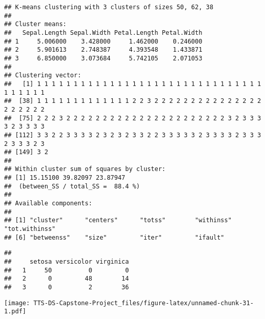 \documentclass[
]{article}
\newenvironment{Shaded}{\begin{snugshade}}{\end{snugshade}}
\newcommand{\AttributeTok}[1]{\textcolor[rgb]{0.77,0.63,0.00}{#1}}
\newcommand{\CommentTok}[1]{\textcolor[rgb]{0.56,0.35,0.01}{\textit{#1}}}
\newcommand{\DecValTok}[1]{\textcolor[rgb]{0.00,0.00,0.81}{#1}}
\newcommand{\FunctionTok}[1]{\textcolor[rgb]{0.00,0.00,0.00}{#1}}
\newcommand{\NormalTok}[1]{#1}
\newcommand{\SpecialCharTok}[1]{\textcolor[rgb]{0.00,0.00,0.00}{#1}}
\newcommand{\StringTok}[1]{\textcolor[rgb]{0.31,0.60,0.02}{#1}}
\begin{document}
\begin{verbatim}
## K-means clustering with 3 clusters of sizes 50, 62, 38
## 
## Cluster means:
##   Sepal.Length Sepal.Width Petal.Length Petal.Width
## 1     5.006000    3.428000     1.462000    0.246000
## 2     5.901613    2.748387     4.393548    1.433871
## 3     6.850000    3.073684     5.742105    2.071053
## 
## Clustering vector:
##   [1] 1 1 1 1 1 1 1 1 1 1 1 1 1 1 1 1 1 1 1 1 1 1 1 1 1 1 1 1 1 1 1 1 1 1 1 1 1
##  [38] 1 1 1 1 1 1 1 1 1 1 1 1 1 2 2 3 2 2 2 2 2 2 2 2 2 2 2 2 2 2 2 2 2 2 2 2 2
##  [75] 2 2 2 3 2 2 2 2 2 2 2 2 2 2 2 2 2 2 2 2 2 2 2 2 2 2 3 2 3 3 3 3 2 3 3 3 3
## [112] 3 3 2 2 3 3 3 3 2 3 2 3 2 3 3 2 2 3 3 3 3 3 2 3 3 3 3 2 3 3 3 2 3 3 3 2 3
## [149] 3 2
## 
## Within cluster sum of squares by cluster:
## [1] 15.15100 39.82097 23.87947
##  (between_SS / total_SS =  88.4 %)
## 
## Available components:
## 
## [1] "cluster"      "centers"      "totss"        "withinss"     "tot.withinss"
## [6] "betweenss"    "size"         "iter"         "ifault"
\end{verbatim}

\begin{Shaded}
\end{Shaded}

\begin{verbatim}
##    
##     setosa versicolor virginica
##   1     50          0         0
##   2      0         48        14
##   3      0          2        36
\end{verbatim}

\begin{Shaded}
\end{Shaded}

\texttt{[image: TTS-DS-Capstone-Project\_files/figure-latex/unnamed-chunk-31-1.pdf]}
\end{document}

